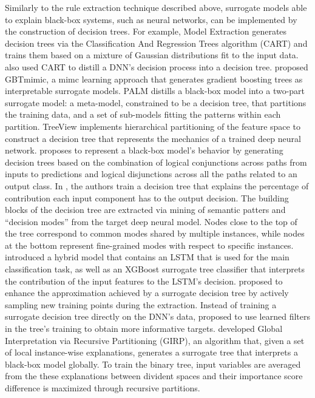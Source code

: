 \documentclass[journal]{IEEEtran}
\begin{document}
Similarly to the rule extraction technique described above, surrogate models able to explain black-box systems, such as neural networks, can be implemented by the construction of decision trees. 
For example, Model Extraction \cite{Bride2018} generates decision trees via the Classification And Regression Trees algorithm (CART) and trains them based on a mixture of Gaussian distributions fit to the input data.
\cite{Liu2019a} also used CART to distill a DNN's decision process into a decision tree.
\cite{Che2016} proposed GBTmimic, a mimc learning approach that generates gradient boosting trees as interpretable surrogate models.
PALM \cite{Krishnan2017} distills a black-box model into a two-part surrogate model: a meta-model, constrained to be a decision tree, that partitions the training data, and a set of sub-models fitting the patterns within each partition. 
TreeView \cite{Thiagarajan2016} implements hierarchical partitioning of the feature space to construct a decision tree that represents the mechanics of a trained deep neural network.
\cite{Bastani2017} proposes to represent a black-box model’s behavior by generating decision trees based on the combination of logical conjunctions across paths from inputs to predictions and logical disjunctions across all the paths related to an output class.
In \cite{Zhang2019}, the authors train a decision tree that explains the percentage of contribution each input component has to the output decision. The building blocks of the decision tree are extracted via mining of semantic patters and “decision modes” from the target deep neural model. Nodes close to the top of the tree correspond to common modes shared by multiple instances, while nodes at the bottom represent fine-grained modes with respect to specific instances. 
\cite{Chatterjee2020} introduced a hybrid model that contains an LSTM that is used for the main classification task, as well as an XGBoost surrogate tree classifier that interprets the contribution of the input features to the LSTM's decision.
\cite{Bastani2017a} proposed to enhance the approximation achieved by a surrogate decision tree by actively sampling new training points during the extraction.
Instead of training a surrogate decision tree directly on the DNN's data, \cite{Frosst2018} proposed to use learned filters in the tree's training to obtain more informative targets.
\cite{Yang2019b} developed Global Interpretation via Recursive Partitioning (GIRP), an algorithm that, given a set of local instance-wise explanations, generates a surrogate tree that interprets a black-box model globally. To train the binary tree, input variables are averaged from the these explanations between divident spaces and their importance score difference is maximized through recursive partitions.
\end{document}
